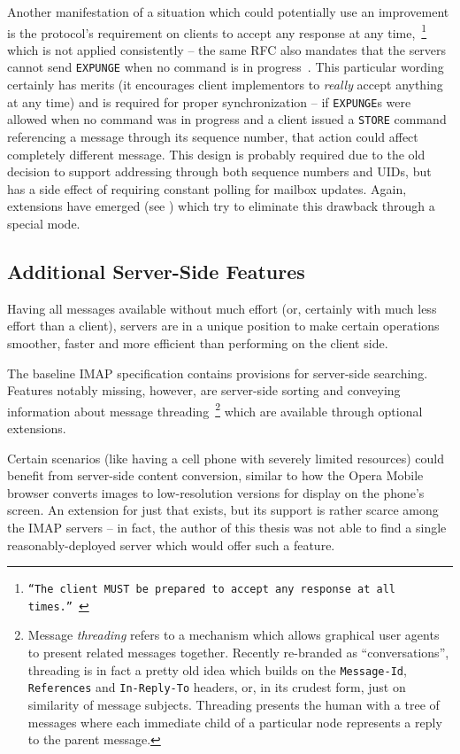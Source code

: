 \documentclass[trojita]{subfiles}
\begin{document}
Another manifestation of a situation which could potentially use an improvement is the protocol's requirement on clients
to accept any response at any time,~\footnote{{\tt ``The client MUST be prepared to accept any response at all
times.''}~\cite[p. 61]{rfc3501}} which is not applied consistently -- the same RFC also mandates that the servers cannot
send {\tt EXPUNGE} when no command is in progress~\cite[p. 72]{rfc3501}.  This particular wording certainly has merits
(it encourages client implementors to {\em really} accept anything at any time) and is required for proper
synchronization -- if {\tt EXPUNGE}s were allowed when no command was in progress and a client issued a {\tt STORE}
command referencing a message through its sequence number, that action could affect completely different message.  This
design is probably required due to the old decision to support addressing through both sequence numbers and UIDs, but
has a side effect of requiring constant polling for mailbox updates.  Again, extensions have emerged (see
) which try to eliminate this drawback through a special mode.

\subsection{Additional Server-Side Features}

Having all messages available without much effort (or, certainly with much less effort than a client), servers are in a
unique position to make certain operations smoother, faster and more efficient than performing on the client side.

The baseline IMAP specification contains provisions for server-side searching.  Features notably missing, however, are
server-side sorting and conveying information about message threading~\footnote{Message {\em threading} refers to a
mechanism which allows graphical user agents to present related messages together.  Recently re-branded as
``conversations'', threading is in fact a pretty old idea which builds on the {\tt Message-Id}, {\tt References} and
{\tt In-Reply-To} headers, or, in its crudest form, just on similarity of message subjects.  Threading presents the
human with a tree of messages where each immediate child of a particular node represents a reply to the parent message.}
which are available through optional extensions.

Certain scenarios (like having a cell phone with severely limited resources) could benefit from server-side content
conversion, similar to how the Opera Mobile browser converts images to low-resolution versions for display on the
phone's screen.  An extension for just that exists, but its support is rather scarce among the IMAP servers -- in fact,
the author of this thesis was not able to find a single reasonably-deployed server which would offer such a feature.
\end{document}
